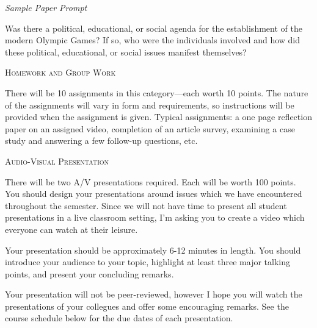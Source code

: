 \documentclass{tufte-handout}
\begin{document}
\begin{fullwidth}
\begin{center}
\textsl{Sample Paper Prompt}
\end{center}
Was there a political, educational, or social agenda for the establishment of the modern Olympic Games? If so, who were the individuals involved and how did these political, educational, or social issues manifest themselves?

\begin{center}
\textsc{Homework and Group Work}
\end{center}
There will be 10 assignments in this category---each worth 10 points. The nature of the assignments will vary in form and requirements, so instructions will be provided when the assignment is given. Typical assignments: a one page reflection paper on an assigned video, completion of an article survey, examining a case study and answering a few follow-up questions, etc.

\end{fullwidth}

\vspace{0.15in}

\begin{center}
\textsc{Audio-Visual Presentation}
\end{center}

There will be two A/V presentations required. Each will be worth 100 points. You should design your presentations around issues which we have encountered throughout the semester. Since we will not have time to present all student presentations in a live classroom setting, I'm asking you to create a video which everyone can watch at their leisure. 

Your presentation should be approximately 6-12 minutes in length. You should introduce your audience to your topic, highlight at least three major talking points, and present your concluding remarks.

Your presentation will not be peer-reviewed, however I hope you will watch the presentations of your collegues and offer some encouraging remarks. See the course schedule below for the due dates of each presentation.
\end{document}
